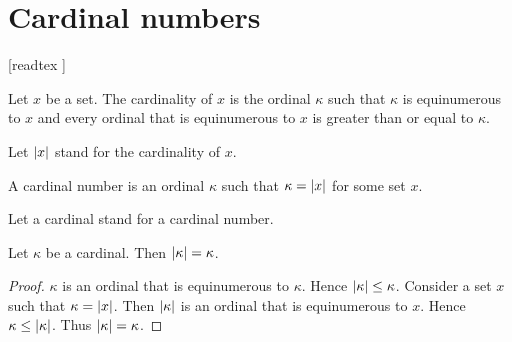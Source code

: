 \documentclass[../set-theory.tex]{subfiles}
\begin{document}
  \chapter{Cardinal numbers}\label{chapter:cardinals}


  \begin{forthel}

    [readtex ]

  \end{forthel}


  \begin{forthel}
    \begin{definition}
      Let $x$ be a set.
      The cardinality of $x$ is the ordinal $\kappa$ such that $\kappa$ is
      equinumerous to $x$ and every ordinal that is equinumerous to $x$ is
      greater than or equal to $\kappa$.
    \end{definition}

    Let $\left\vert x\right\vert$ stand for the cardinality of $x$.
  \end{forthel}

  \begin{forthel}
    \begin{definition}
      A cardinal number is an ordinal $\kappa$ such that $\kappa = \left\vert x\right\vert$ for some
      set $x$.
    \end{definition}

    Let a cardinal stand for a cardinal number.
  \end{forthel}

  \begin{forthel}
    \begin{proposition}
      Let $\kappa$ be a cardinal.
      Then $\left\vert\kappa\right\vert = \kappa$.
    \end{proposition}
    \begin{proof}
      $\kappa$ is an ordinal that is equinumerous to $\kappa$.
      Hence $\left\vert\kappa\right\vert \leq \kappa$.
      Consider a set $x$ such that $\kappa = \left\vert x\right\vert$.
      Then $\left\vert\kappa\right\vert$ is an ordinal that is equinumerous to $x$.
      Hence $\kappa \leq \left\vert\kappa\right\vert$.
      Thus $\left\vert\kappa\right\vert = \kappa$.
    \end{proof}
  \end{forthel}
\end{document}
